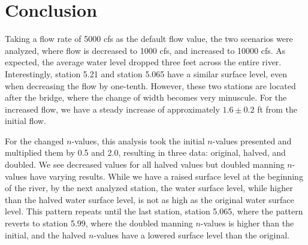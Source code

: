 \documentclass{article}
\begin{document}
\section{Conclusion}
\par Taking a flow rate of 5000 cfs as the default flow value, the two scenarios were analyzed, where flow is decreased to 1000 cfs, and increased to 10000 cfs. As expected, the average water level dropped three feet across the entire river. Interestingly, station 5.21 and station 5.065 have a similar surface level, even when decreasing the flow by one-tenth. However, these two stations are located after the bridge, where the change of width becomes very minuscule. For the increased flow, we have a steady increase of approximately $1.6 \pm 0.2$ ft from the initial flow.
\par For the changed $n$-values, this analysis took the initial $n$-values presented and multiplied them by 0.5 and 2.0, resulting in three data: original, halved, and doubled. We see decreased values for all halved values but doubled manning $n$-values have varying results. While we have a raised surface level at the beginning of the river, by the next analyzed station, the water surface level, while higher than the halved water surface level, is not as high as the original water surface level. This pattern repeats until the last station, station 5.065, where the pattern reverts to station 5.99, where the doubled manning $n$-values is higher than the initial, and the halved $n$-values have a lowered surface level than the original. 

\newpage
\end{document}
